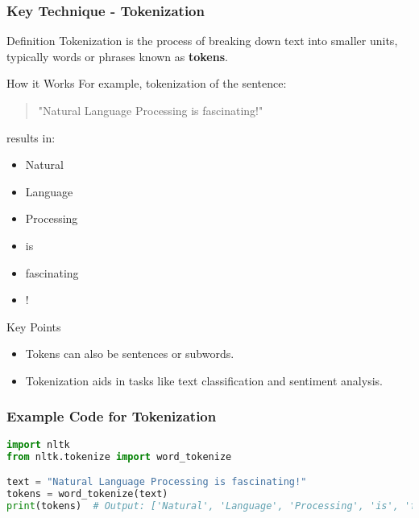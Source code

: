 \documentclass[aspectratio=169]{beamer}
\begin{document}
\begin{frame}[fragile]
    \frametitle{Key Technique - Tokenization}
    \begin{block}{Definition}
        Tokenization is the process of breaking down text into smaller units, typically words or phrases known as \textbf{tokens}.
    \end{block}

    \begin{block}{How it Works}
        For example, tokenization of the sentence:
        \begin{quote}
            "Natural Language Processing is fascinating!"
        \end{quote}
        results in:
        \begin{itemize}
            \item Natural
            \item Language
            \item Processing
            \item is
            \item fascinating
            \item !
        \end{itemize}
    \end{block}

    \begin{block}{Key Points}
        \begin{itemize}
            \item Tokens can also be sentences or subwords.
            \item Tokenization aids in tasks like text classification and sentiment analysis.
        \end{itemize}
    \end{block}
\end{frame}

\begin{frame}[fragile]
    \frametitle{Example Code for Tokenization}
    \begin{lstlisting}[language=Python]
import nltk
from nltk.tokenize import word_tokenize

text = "Natural Language Processing is fascinating!"
tokens = word_tokenize(text)
print(tokens)  # Output: ['Natural', 'Language', 'Processing', 'is', 'fascinating', '!']
    \end{lstlisting}
\end{frame}
\end{document}
